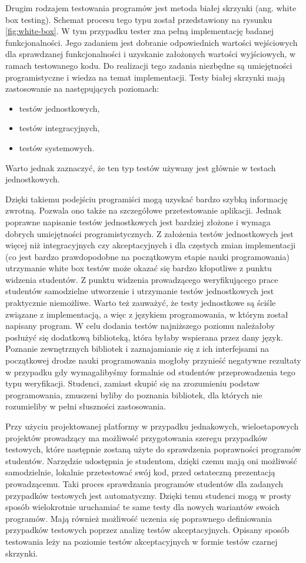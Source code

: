 Drugim rodzajem testowania programów jest metoda białej skrzynki (ang. white box testing).
Schemat procesu tego typu został przedstawiony na rysunku \ref{fig:white-box}.
W tym przypadku tester zna pełną implementację badanej funkcjonalności.
Jego zadaniem jest dobranie odpowiednich wartości wejściowych dla sprawdzanej funkcjonalności i uzyskanie założonych wartości wyjściowych, w ramach testowanego kodu.
Do realizacji tego zadania niezbędne są umiejętności programistyczne i wiedza na temat implementacji.
Testy białej skrzynki mają zastosowanie na następujących poziomach:
\begin{itemize}
    \item testów jednostkowych,
    \item testów integracyjnych,
    \item testów systemowych.
\end{itemize}
Warto jednak zaznaczyć, że ten typ testów używany jest głównie w testach jednostkowych.

Dzięki takiemu podejściu programiści mogą uzyskać bardzo szybką informację zwrotną.
Pozwala ono także na szczegółowe przetestowanie aplikacji.
Jednak poprawne napisanie testów jednostkowych jest bardziej złożone i wymaga dobrych umiejętności programistycznych.
Z założenia testów jednostkowych jest więcej niż integracyjnych czy akceptacyjnych i dla częstych zmian implementacji (co jest bardzo prawdopodobne na początkowym etapie nauki programowania) utrzymanie white box testów może okazać się bardzo kłopotliwe z punktu widzenia studentów.
Z punktu widzenia prowadzącego weryfikującego prace studentów samodzielne utworzenie i utrzymanie testów jednostkowych jest praktycznie niemożliwe.
Warto też zauważyć, że testy jednostkowe są ściśle związane z implementacją, a więc z językiem programowania, w którym został napisany program.
W celu dodania testów najniższego poziomu należałoby posłużyć się dodatkową biblioteką, która byłaby wspierana przez dany język.
Poznanie zewnętrznych bibliotek i zaznajamianie się z ich interfejsami na początkowej drodze nauki programowania mogłoby przynieść negatywne rezultaty w przypadku gdy wymagalibyśmy formalnie od studentów przeprowadzenia tego typu weryfikacji.
Studenci, zamiast skupić się na zrozumieniu podstaw programowania, zmuszeni byliby do poznania bibliotek, dla których nie rozumieliby w pełni słuszności zastosowania.

Przy użyciu projektowanej platformy w przypadku jednakowych, wieloetapowych projektów prowadzący ma możliwość przygotowania szeregu przypadków testowych, które następnie zostaną użyte do sprawdzenia poprawności programów studentów.
Narzędzie udostępnia je studentom, dzięki czemu mają oni możliwość samodzielnie, lokalnie przetestować swój kod, przed ostateczną prezentacją prowadzącemu.
Taki proces sprawdzania programów studentów dla zadanych przypadków testowych jest automatyczny.
Dzięki temu studenci mogą w prosty sposób wielokrotnie uruchamiać te same testy dla nowych wariantów swoich programów.
Mają również możliwość uczenia się poprawnego definiowania przypadków testowych poprzez analizę testów akceptacyjnych.
Opisany sposób testowania leży na poziomie testów akceptacyjnych w formie testów czarnej skrzynki.

